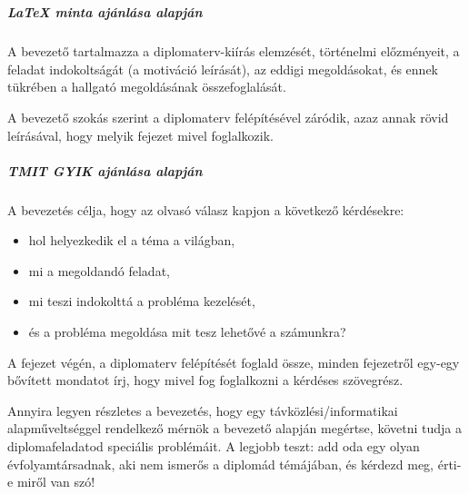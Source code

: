 \chapter{\bevezetes}

\paragraph{LaTeX minta ajánlása alapján}\mbox{}\smallskip

A bevezető tartalmazza a diplomaterv-kiírás elemzését, történelmi előzményeit, a feladat indokoltságát (a motiváció leírását), az eddigi megoldásokat, és ennek tükrében a hallgató megoldásának összefoglalását.

A bevezető szokás szerint a diplomaterv felépítésével záródik, azaz annak rövid leírásával, hogy melyik fejezet mivel foglalkozik.

\paragraph{TMIT GYIK ajánlása alapján}\mbox{}\smallskip

A bevezetés célja, hogy az olvasó válasz kapjon a következő kérdésekre:
\begin{itemize}
    \item hol helyezkedik el a téma a világban,
    \item mi a megoldandó feladat,
    \item mi teszi indokolttá a probléma kezelését,
    \item és a probléma megoldása mit tesz lehetővé a számunkra?
\end{itemize}

A fejezet végén, a diplomaterv felépítését foglald össze, minden fejezetről egy-egy bővített mondatot írj, hogy mivel fog foglalkozni a kérdéses szövegrész.

Annyira legyen részletes a bevezetés, hogy egy távközlési/informatikai alapműveltséggel rendelkező mérnök a bevezető alapján megértse, követni tudja a diplomafeladatod speciális problémáit. A legjobb teszt: add oda egy olyan évfolyamtársadnak, aki nem ismerős a diplomád témájában, és kérdezd meg, érti-e miről van szó!